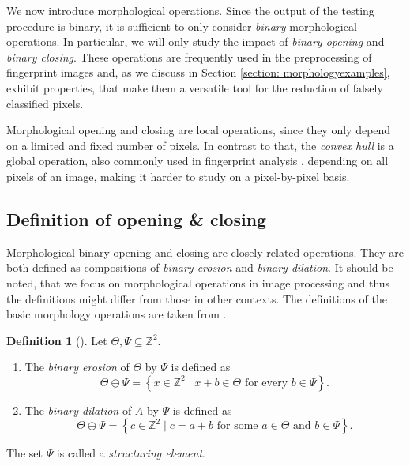 \documentclass[a4paper,12pt]{article}
\theoremstyle{plain}
\theoremstyle{definition}
\newtheorem{definition}[theorem]{Definition}
\numberwithin{equation}{section}
\begin{document}
We now introduce morphological operations. Since the output of the testing procedure is binary, it is sufficient to only consider \emph{binary} morphological operations. In particular, we will only study the impact of \emph{binary opening} and \emph{binary closing}. These operations are frequently used in the preprocessing of fingerprint images \cite{BazenGerez, adaboost} and, as we discuss in Section \ref{section: morphologyexamples}, exhibit properties, that make them a versatile tool for the reduction of falsely classified pixels.

Morphological opening and closing are local operations, since they only depend on a limited and fixed number of pixels. In contrast to that, the \emph{convex hull} is a global operation, also commonly used in fingerprint analysis \cite{FDB}, depending on all pixels of an image, making it harder to study on a pixel-by-pixel basis.



\subsection{Definition of opening \& closing}

Morphological binary opening and closing are closely related operations. They are both defined as compositions of \emph{binary erosion} and \emph{binary dilation}. It should be noted, that we focus on morphological operations in image processing and thus the definitions might differ from those in other contexts. The definitions of the basic morphology operations are taken from \cite{imageprocessing}.

\begin{definition}[{\cite[p.~64-68]{imageprocessing}}]\label{def: binerodil}
	Let $\Theta, \Psi \subseteq \mathbb{Z}^2$.
	\begin{enumerate}
		\item The \emph{binary erosion} of $\Theta$ by $\Psi$ is defined as
		\begin{equation*}
			\Theta \ominus \Psi = \left\{ x \in \mathbb{Z}^2 \mid x + b \in \Theta \textrm{ for every } b \in \Psi \right\}.
		\end{equation*}
		\item The \emph{binary dilation} of $A$ by $\Psi$ is defined as
		\begin{equation*}
			\Theta \oplus \Psi = \left\{ c \in \mathbb{Z}^2 \mid c = a + b \textrm{ for some } a \in \Theta \textrm{ and } b \in \Psi \right\}.
		\end{equation*}
	\end{enumerate}
	The set $\Psi$ is called a \emph{structuring element}.
\end{definition}
\end{document}
